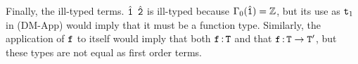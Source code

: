 \documentclass{amsart}
\begin{document}
\begin{solution}
  \noindent
  Finally, the ill-typed terms. \(\hat{\texttt{1}} \texttt{ } \hat{\texttt{2}}\) is
  ill-typed because \(\Gamma_0(\hat{\texttt{1}}) = \mathbb{Z}\), but its use as
  \(\texttt{t}_1\) in (DM-App) would imply that it must be a function type.
  Similarly, the application of \(\texttt{f}\) to itself would imply that both
  \(\texttt{f} \operatorname{:} \texttt{T}\) and that \(\texttt{f} \operatorname{:} \texttt{T} \to
  \texttt{T}^\prime\), but these types are not equal as first order terms.
\end{solution}
\end{document}
